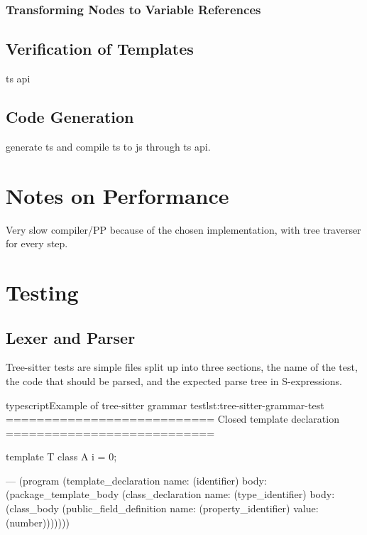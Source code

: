 \subsubsection{Transforming Nodes to Variable References}\label{subsubsec:transforming-nodes-to-variable-references}

\subsection{Verification of Templates}\label{subsec:verification-of-templates}

ts api

\subsection{Code Generation}\label{subsec:code-generation}

generate ts and compile ts to js through ts api.

\section{Notes on Performance}\label{sec:notes-on-performance}

Very slow compiler/PP because of the chosen implementation, with tree traverser for every step.


\section{Testing}\label{sec:testing}

\subsection{Lexer and Parser}\label{subsec:testing-lexer-and-parser}

Tree-sitter tests are simple  files split up into three sections, the name of the test, the code that should be parsed, and the expected parse tree in S-expressions\cite{sexprs}.

\begin{code}{typescript}{Example of tree-sitter grammar test}{lst:tree-sitter-grammar-test}
    ===========================
    Closed template declaration
    ===========================

    template T {
        class A {
            i = 0;
        }
    }

    ---
    (program
        (template_declaration
            name: (identifier)
            body: (package_template_body
                    (class_declaration
                        name: (type_identifier)
                        body: (class_body
                            (public_field_definition
                                name: (property_identifier)
                                value: (number)))))))

\end{code}


